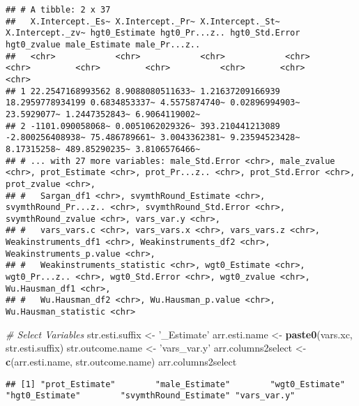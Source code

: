 \documentclass[
]{book}
\newenvironment{Shaded}{\begin{snugshade}}{\end{snugshade}}
\newcommand{\CommentTok}[1]{\textcolor[rgb]{0.56,0.35,0.01}{\textit{#1}}}
\newcommand{\KeywordTok}[1]{\textcolor[rgb]{0.13,0.29,0.53}{\textbf{#1}}}
\newcommand{\NormalTok}[1]{#1}
\newcommand{\OperatorTok}[1]{\textcolor[rgb]{0.81,0.36,0.00}{\textbf{#1}}}
\newcommand{\StringTok}[1]{\textcolor[rgb]{0.31,0.60,0.02}{#1}}
\begin{document}
\begin{verbatim}
## # A tibble: 2 x 37
##   X.Intercept._Es~ X.Intercept._Pr~ X.Intercept._St~ X.Intercept._zv~ hgt0_Estimate hgt0_Pr...z.. hgt0_Std.Error hgt0_zvalue male_Estimate male_Pr...z..
##   <chr>            <chr>            <chr>            <chr>            <chr>         <chr>         <chr>          <chr>       <chr>         <chr>        
## 1 22.2547168993562 8.9088080511633~ 1.21637209166939 18.2959778934199 0.6834853337~ 4.5575874740~ 0.02896994903~ 23.5929077~ 1.2447352843~ 6.9064119002~
## 2 -1101.090058068~ 0.0051062029326~ 393.210441213089 -2.800256408938~ 75.486789661~ 3.0043362381~ 9.23594523428~ 8.17315258~ 489.85290235~ 3.8106576466~
## # ... with 27 more variables: male_Std.Error <chr>, male_zvalue <chr>, prot_Estimate <chr>, prot_Pr...z.. <chr>, prot_Std.Error <chr>, prot_zvalue <chr>,
## #   Sargan_df1 <chr>, svymthRound_Estimate <chr>, svymthRound_Pr...z.. <chr>, svymthRound_Std.Error <chr>, svymthRound_zvalue <chr>, vars_var.y <chr>,
## #   vars_vars.c <chr>, vars_vars.x <chr>, vars_vars.z <chr>, Weakinstruments_df1 <chr>, Weakinstruments_df2 <chr>, Weakinstruments_p.value <chr>,
## #   Weakinstruments_statistic <chr>, wgt0_Estimate <chr>, wgt0_Pr...z.. <chr>, wgt0_Std.Error <chr>, wgt0_zvalue <chr>, Wu.Hausman_df1 <chr>,
## #   Wu.Hausman_df2 <chr>, Wu.Hausman_p.value <chr>, Wu.Hausman_statistic <chr>
\end{verbatim}

\begin{Shaded}
\begin{Highlighting}[]
\CommentTok{# Select Variables}
\NormalTok{str.esti.suffix <-}\StringTok{ '_Estimate'}
\NormalTok{arr.esti.name <-}\StringTok{ }\KeywordTok{paste0}\NormalTok{(vars.xc, str.esti.suffix)}
\NormalTok{str.outcome.name <-}\StringTok{ 'vars_var.y'}
\NormalTok{arr.columns2select <-}\StringTok{ }\KeywordTok{c}\NormalTok{(arr.esti.name, str.outcome.name)}
\NormalTok{arr.columns2select}
\end{Highlighting}
\end{Shaded}

\begin{verbatim}
## [1] "prot_Estimate"        "male_Estimate"        "wgt0_Estimate"        "hgt0_Estimate"        "svymthRound_Estimate" "vars_var.y"
\end{verbatim}

\begin{Shaded}
\end{Shaded}
\end{document}
